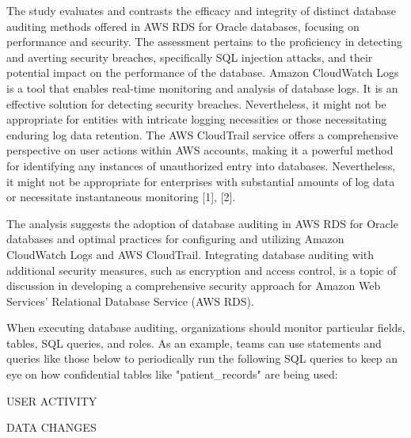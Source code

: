 \documentclass{ieee}
\begin{document}

The study evaluates and contrasts the efficacy and integrity of distinct database auditing methods offered in AWS RDS for Oracle databases, focusing on performance and security. The assessment pertains to the proficiency in detecting and averting security breaches, specifically SQL injection attacks, and their potential impact on the performance of the database. Amazon CloudWatch Logs is a tool that enables real-time monitoring and analysis of database logs. It is an effective solution for detecting security breaches. Nevertheless, it might not be appropriate for entities with intricate logging necessities or those necessitating enduring log data retention. The AWS CloudTrail service offers a comprehensive perspective on user actions within AWS accounts, making it a powerful method for identifying any instances of unauthorized entry into databases. Nevertheless, it might not be appropriate for enterprises with substantial amounts of log data or necessitate instantaneous monitoring [1], [2].


The analysis suggests the adoption of database auditing in AWS RDS for Oracle databases and optimal practices for configuring and utilizing Amazon CloudWatch Logs and AWS CloudTrail. Integrating database auditing with additional security measures, such as encryption and access control, is a topic of discussion in developing a comprehensive security approach for Amazon Web Services' Relational Database Service (AWS RDS).

When executing database auditing, organizations should monitor particular fields, tables, SQL queries, and roles. As an example, teams can use statements and queries like those below to periodically run the following SQL queries to keep an eye on how confidential tables like "patient\_records" are being used:

    {USER ACTIVITY}

    {DATA CHANGES}
\end{document}
